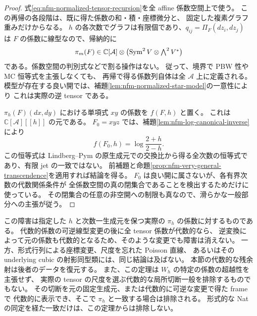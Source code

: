 \begin{proof}
式\eqref{eq:nfm-normalized-tensor-recursion}を全 affine 係数空間上で使う。
この再帰の各段階は、既に得た係数の和・積・座標微分と、
固定した複素グラフ重みだけからなる。
$h$ の各次数でグラフは有限個であり、$q_{ij}=\Pi_F(dz_i,dz_j)$ は
$F$ の係数に線型なので、帰納的に
\[
 \pi_m(F)\in\mathbb C[\mathcal A]\otimes
      \bigl(\operatorname{Sym}^2V\otimes\textstyle\bigwedge^2V^*\bigr)
\]
である。係数空間の判別式などで割る操作はない。
従って、境界で PBW 性や MC 恒等式を主張しなくても、
再帰で得る係数列自体は全 $\mathcal A$ 上に定義される。
模型が存在する良い開では、補題\ref{lem:nfm-normalized-star-model}の一意性により
これは実際の逆 tensor である。

$\pi_h(F)(dx,dy)$ における単項式 $xy$ の係数を $f(F,h)$ と置く。
これは $\mathbb C[\mathcal A][[h]]$ の元である。
$F_0=xyz$ では、補題\ref{lem:nfm-log-canonical-inverse}により
\[
 f(F_0,h)=\log\frac{2+h}{2-h}.
\]
この恒等式は Lindberg--Pym\cite[Section~1.6; Theorem~6.9, Remark~6.10]{NFMLindbergPym}
の原生成元での交換比から得る全次数の恒等式であり、有限 jet の一致ではない。
前補題と命題\ref{prop:nfm-very-general-transcendence}を適用すれば結論を得る。
$F_0$ は良い開に属さないが、各有界次数の代数関係条件が
全係数空間の真の閉集合であることを検出するためだけに使っている。
その閉集合の任意の非空開への制限も真なので、滑らかな一般部分への主張が従う。
\end{proof}

\begin{remark}
この障害は指定した $h$ と次数一生成元を保つ実際の $\pi_h$ の係数に対するものである。
代数的係数の可逆線型変更の後に全 tensor 係数が代数的なら、
逆変換によって元の係数も代数的となるため、そのような変更でも障害は消えない。
一方、形式行列による座標変更、尺度を忘れた Poisson 直線、
あるいはその underlying cubic の射影同型類には、同じ結論は及ばない。
本節の代数的な残余射は後者のデータを復元する。
また、この定理は $W_h$ の特定の係数の超越性を主張せず、
実際の tensor の尺度を選ぶ代数的な局所切断一般を排除するものでもない。
その切断を元の固定生成元、または代数的に可逆な変更で得た frame で
代数的に表示でき、そこで $\pi_h$ と一致する場合は排除される。
形式的な Nat の同定を経た一致だけは、この定理からは排除しない。
\end{remark}

